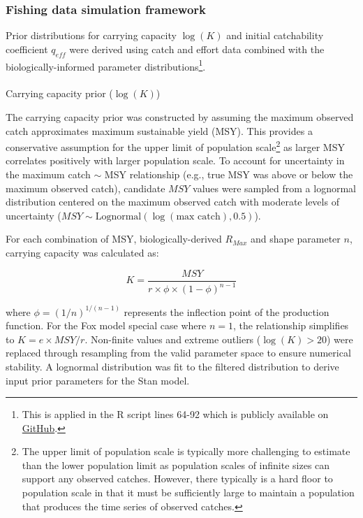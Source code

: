 \documentclass[
  11pt,
]{SCreport}
\makeatletter
\let\oldparagraph\paragraph
\renewcommand{\paragraph}{
    \@ifstar
      \xxxParagraphStar
      \xxxParagraphNoStar
  }
\newcommand{\xxxParagraphStar}[1]{\oldparagraph*{#1}\mbox{}}
\newcommand{\xxxParagraphNoStar}[1]{\oldparagraph{#1}\mbox{}}
\makeatother
\begin{document}
\subsubsection{Fishing data simulation
framework}\label{sec-fishing-data-simulation}

Prior distributions for carrying capacity \(\log(K)\) and initial
catchability coefficient \(q_{eff}\) were derived using catch and effort
data combined with the biologically-informed parameter
distributions\footnote{This is applied in the R script
  lines 64-92 which is publicly available on
  \href{https://github.com/N-DucharmeBarth-NOAA/2025-swpo-mls-bspm/blob/main/code/R/03-06-new-logK-prior-pushforward-bspm_estqsimple_softdep_mvprior_x0.r}{GitHub}.}.

\paragraph{\texorpdfstring{Carrying capacity prior
(\(\log(K)\))}{Carrying capacity prior (\textbackslash log(K))}}\label{carrying-capacity-prior-logk}

The carrying capacity prior was constructed by assuming the maximum
observed catch approximates maximum sustainable yield (MSY). This
provides a conservative assumption for the upper limit of population
scale\footnote{The upper limit of population scale is typically more
  challenging to estimate than the lower population limit as population
  scales of infinite sizes can support any observed catches. However,
  there typically is a hard floor to population scale in that it must be
  sufficiently large to maintain a population that produces the time
  series of observed catches.} as larger MSY correlates positively with
larger population scale. To account for uncertainty in the maximum catch
\(\sim\) MSY relationship (e.g., true MSY was above or below the maximum
observed catch), candidate \(MSY\) values were sampled from a lognormal
distribution centered on the maximum observed catch with moderate levels
of uncertainty
(\(MSY \sim \text{Lognormal}(\log(\text{max catch}), 0.5)\)).

For each combination of MSY, biologically-derived \(R_{Max}\) and shape
parameter \(n\), carrying capacity was calculated as:

\[K = \frac{MSY}{r \times \phi \times (1-\phi)^{n-1}}\]

where \(\phi = (1/n)^{1/(n-1)}\) represents the inflection point of the
production function. For the Fox model special case where \(n = 1\), the
relationship simplifies to \(K = e \times MSY / r\). Non-finite values
and extreme outliers (\(\log(K) > 20\)) were replaced through resampling
from the valid parameter space to ensure numerical stability. A
lognormal distribution was fit to the filtered distribution to derive
input prior parameters for the Stan model.
\end{document}
